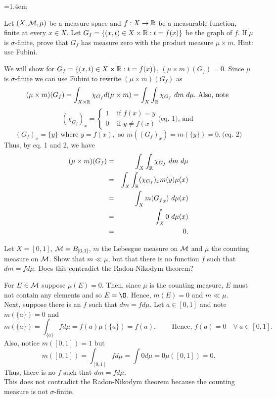 \begin{list}
{}
{\leftmargin=1.4em}
\item Let $(X, {\mathcal M}, \mu)$ be a measure space and $f: X \rightarrow {\mathbb R}$ be a measurable function, finite at every $x \in X$. Let $G_f= \{ (x, t) \in X \times {\mathbb R} : t = f(x) \}$ be the graph of $f$. If $\mu$ is $\sigma$-finite, prove that $G_f$ has measure zero with the product measure $\mu \times m$. Hint: use Fubini.
\begin{pf}
	We will show for $G_f= \{ (x, t) \in X \times {\mathbb R} : t = f(x) \}$, $(\mu \times m)(G_f)=0$. Since $\mu$ is $\sigma$-finite we can use Fubini to rewrite $(\mu \times m)(G_f)$ as 
	\[
	(\mu \times m)(G_f) = \int_{X \times {\mathbb R}} \chi_{G_f} d (\mu \times m) = \int_X \int_{\mathbb R} \chi_{G_f}\ dm \ d\mu. \text{ Also, note }
	\]
	\[
	(\chi_{G_f})_x  =  \left\{
	\begin{array}{ll}	
	1 & \text{ if } f(x) = y \\
	0 & \text{ if } y \neq f(x)
	\end{array} \right.\text{(eq. 1), and }
	\]
	\[
	({G_f})_x  =  \{y\} \text{ where } y = f(x), 
	\text{ so } m(({G_f})_x)  =  m(\{y\})=0. \ \text{(eq. 2)}
	\]
	Thus, by eq. 1 and 2, we have
	\begin{eqnarray*}
(\mu \times m)(G_f)& =&	\int_X \int_{\mathbb R} \chi_{G_f}\ dm \ d\mu\\
 & = & \int_X  \int_{\mathbb R} (\chi_{G_f})_x  m(y)   \mu(x)	\\
	& = & \int_X m({G_f}_x) \ d \mu(x) \\
	& = & \int_X 0 \ d \mu(x) \\
	& = & 0.
	\end{eqnarray*}
\end{pf}

\item Let $X=[0,1]$, ${\mathcal M}=B_{[0,1]}$, $m$ the Lebesgue measure on ${\mathcal M}$ and $\mu$ the counting measure on ${\mathcal M}$. Show that $m \ll \mu$, but that there is no function $f$ such that $dm=fd\mu$. Does this contradict the Radon-Nikodym theorem?
\begin{pf}
	For $E \in {\mathcal M}$ suppose $\mu(E)=0$. Then, since $\mu$ is the counting measure, $E$ must not contain any elements and so $E = \O$. Hence, $m(E)=0$ and $m \ll \mu$. \\Next, suppose there is an $f$ such that $dm = f d \mu$. Let $a \in [0, 1]$ and note $m(\{ a \})=0$ and 
	\[
	m(\{a\}) = \int_{\{a\}} f d \mu = f(a) \mu (\{ a \}) = f(a). \qquad \text{ Hence, } f(a) = 0 \quad \forall \ a \in [0,1].
	\]
	Also, notice $m([0,1])=1$ but 
	\[
	m([0,1]) = \int_{[0,1]}f d \mu = \int 0 d \mu = 0 \mu([0,1]) = 0.
	\]
	Thus, there is no $f$ such that $dm = f d \mu$.\\
	This does not contradict the Radon-Nikodym theorem because the counting measure is not $\sigma$-finite.
\end{pf}


\end{list}
